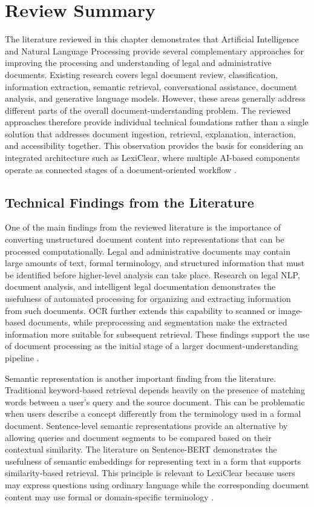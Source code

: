 \documentclass[12pt,a4paper,oneside]{report}
\begin{document}
\section{Review Summary}

The literature reviewed in this chapter demonstrates that Artificial
Intelligence and Natural Language Processing provide several complementary
approaches for improving the processing and understanding of legal and
administrative documents. Existing research covers legal document review,
classification, information extraction, semantic retrieval, conversational
assistance, document analysis, and generative language models. However, these
areas generally address different parts of the overall document-understanding
problem. The reviewed approaches therefore provide individual technical
foundations rather than a single solution that addresses document ingestion,
retrieval, explanation, interaction, and accessibility together. This
observation provides the basis for considering an integrated architecture
such as LexiClear, where multiple AI-based components operate as connected
stages of a document-oriented workflow
\cite{mahoney2019,kandula2023,jurisai2025}.

\subsection{Technical Findings from the Literature}

One of the main findings from the reviewed literature is the importance of
converting unstructured document content into representations that can be
processed computationally. Legal and administrative documents may contain
large amounts of text, formal terminology, and structured information that
must be identified before higher-level analysis can take place. Research on
legal NLP, document analysis, and intelligent legal documentation demonstrates
the usefulness of automated processing for organizing and extracting
information from such documents. OCR further extends this capability to
scanned or image-based documents, while preprocessing and segmentation make
the extracted information more suitable for subsequent retrieval. These
findings support the use of document processing as the initial stage of a
larger document-understanding pipeline
\cite{bommarito2018lexnlp,pramanik2025}.

Semantic representation is another important finding from the literature.
Traditional keyword-based retrieval depends heavily on the presence of
matching words between a user's query and the source document. This can be
problematic when users describe a concept differently from the terminology
used in a formal document. Sentence-level semantic representations provide an
alternative by allowing queries and document segments to be compared based on
their contextual similarity. The literature on Sentence-BERT demonstrates
the usefulness of semantic embeddings for representing text in a form that
supports similarity-based retrieval. This principle is relevant to LexiClear
because users may express questions using ordinary language while the
corresponding document content may use formal or domain-specific terminology
\cite{reimers2019sbert}.
\end{document}
